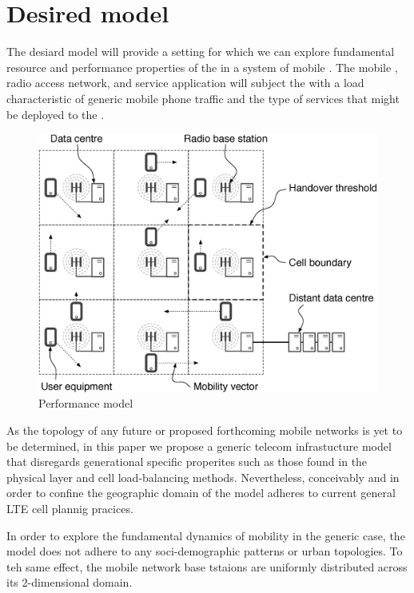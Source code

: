 \section{Desired model}

The desiard model will provide a setting for which we can explore fundamental resource and performance properties of the \xcloud in a system of mobile \ues. The mobile \ues, radio access network, and service application will subject the \dcs with a load characteristic of generic mobile phone traffic and the type of services that might be deployed to the \xcloud.

\begin{figure}[tb]
	\centering
	\includegraphics[width=\linewidth]{desiard_model.eps} 
	\caption{Performance model}
	\label{fig:performance_model}
\end{figure}

As the topology of any future \xcloud or proposed forthcoming mobile networks is yet to be determined, in this paper we propose a generic telecom infrastucture model that disregards generational specific properites such as those found in the physical layer and cell load-balancing methods. Nevertheless, conceivably and in order to confine the geographic domain of the model adheres to current general LTE cell plannig pracices. 

In order to explore the fundamental dynamics of mobility in the generic case, the model does not adhere to any soci-demographic patterns or urban topologies. To teh same effect, the mobile network base tstaions are  uniformly distributed across its 2-dimensional domain.

